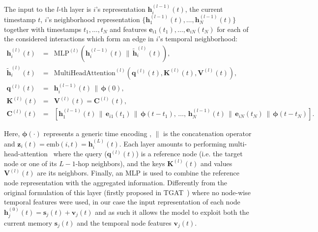 \documentclass{article}
\begin{document}
The input to the $l$-th layer is $i$'s representation $\mathbf{h}_i^{(l-1)}(t)$, the current timestamp $t$, $i$'s neighborhood representation $\{\mathbf{h}_1^{(l-1)}(t), \ldots, \mathbf{h}_N^{(l-1)}(t)\}$ together with timestamps $t_1, \ldots, t_N$ and features $\mathbf{e}_{i1}(t_1), \ldots, \mathbf{e}_{iN}(t_N)$ for each of the considered interactions which form an edge in $i$'s temporal neighborhood: %
%
\begin{eqnarray}
    \mathbf{h}_i^{(l)}(t) &=&\mathrm{MLP}^{(l)}(\mathbf{h}_i^{(l-1)}(t) \, \|\, \tilde{\mathbf{h}}_i^{(l)}(t)),\\
    \tilde{\mathbf{h}}_i^{(l)}(t) &=& \mathrm{MultiHeadAttention}^{(l)}(\mathbf{q}^{(l)}(t), \mathbf{K}^{(l)}(t), \mathbf{V}^{(l)}(t)), \\
    \mathbf{q}^{(l)}(t) &=& \mathbf{h}_i^{(l-1)}(t) \, \| \, \boldsymbol{\phi}(0),\\
    \mathbf{K}^{(l)}(t) &=& \mathbf{V}^{(l)}(t) = \mathbf{C}^{(l)}(t), \\
    \mathbf{C}^{(l)}(t) &=& [\mathbf{h}^{(l-1)}_1(t) \,\|\, \mathbf{e}_{i1}(t_1) \,\|\, \boldsymbol{\phi}(t - t_{1}),\, \ldots,\, 
    \mathbf{h}^{(l-1)}_N(t)\, \|\, \mathbf{e}_{iN}(t_N)\, \|\, \boldsymbol{\phi}(t - t_{N})].
\end{eqnarray}


 Here,  $\boldsymbol{\phi}(\cdot)$ represents a generic time encoding \citep{Xu2020Inductive}, $\|$ is the concatenation operator and $\mathbf{z}_i(t) = \mathrm{emb}(i, t) = \mathbf{h}_i^{(L)}(t)$. Each layer amounts to performing multi-head-attention~\citep{NIPS2017_7181} where the query ($\mathbf{q}^{(l)}(t)$) is a reference node (i.e. the target node or one of its $L-1$-hop neighbors), and the keys $\mathbf{K}^{(l)}(t)$ and values $\mathbf{V}^{(l)}(t)$ are its neighbors. Finally, an MLP is used to combine the reference node representation with the aggregated information. %
 Differently from the original formulation of this layer (firstly proposed in TGAT~\citep{Xu2020Inductive}) where no node-wise temporal features were used, in our case the input representation of each node $\mathbf{h}^{(0)}_j(t) = \mathbf{s}_j(t) + \mathbf{v}_j(t)$ and as such it allows the model to exploit both the current memory $\mathbf{s}_j(t)$ and the temporal node features $\mathbf{v}_j(t)$.%
\end{document}
